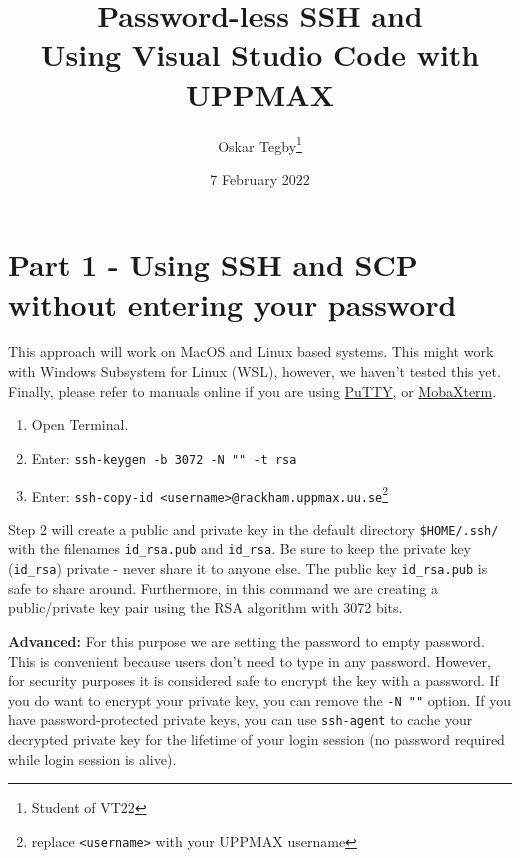 \documentclass[10pt]{article}
\title{Password-less SSH and \\ Using Visual Studio Code with UPPMAX}
\author{Oskar Tegby\thanks{Student of VT22}}
\date{7 February 2022}
\begin{document}
\maketitle

\section{Part 1 - Using SSH and SCP without entering your password}
This approach will work on MacOS and Linux based systems. This might work with Windows Subsystem for Linux
(WSL), however, we haven't tested this yet. Finally, please refer to manuals online if you are using
\href{https://devops.ionos.com/tutorials/use-ssh-keys-with-putty-on-windows/}{PuTTY}, or
\href{https://ubccr.freshdesk.com/support/solutions/articles/13000034093-using-ssh-keys-with-mobaxterm-windows-}{MobaXterm}.

\begin{enumerate}
\item Open Terminal.
\item Enter: \texttt{ssh-keygen -b 3072 -N "" -t rsa}
\item Enter: \texttt{ssh-copy-id <username>@rackham.uppmax.uu.se}\footnote{replace
\texttt{<username>} with your
UPPMAX username}
\end{enumerate}

Step 2 will create a public and private key in the default directory \texttt{\$HOME/.ssh/} with the
filenames \texttt{id\_rsa.pub} and \texttt{id\_rsa}. Be sure to keep the private key (\texttt{id\_rsa})
private - never share it to anyone else. The public key \texttt{id\_rsa.pub} is safe to share
around. Furthermore, in this command we are creating a public/private key pair using the RSA
algorithm with 3072 bits. 

\textbf{Advanced: }For this purpose we are setting the password to empty password. This is
convenient because users don't need to type in any password. However, for security purposes it is
considered safe to encrypt the key with a password. If you do want to encrypt your private key, you
can remove the \texttt{-N ""} option. If you have password-protected private keys, you can use
\texttt{ssh-agent} to cache your decrypted private key for the lifetime of your login session (no
password required while login session is alive).

\end{document}
